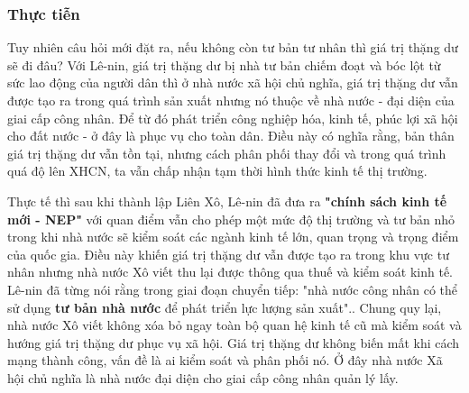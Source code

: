 \subsubsection{Thực tiễn}

Tuy nhiên câu hỏi mới đặt ra, nếu không còn tư bản tư nhân thì giá trị thặng dư sẽ đi đâu? Với Lê-nin, giá trị thặng dư bị nhà tư bản chiếm đoạt và bóc lột từ sức lao động của người dân thì ở nhà nước xã hội chủ nghĩa, giá trị thặng dư vẫn được tạo ra trong quá trình sản xuất nhưng nó thuộc về nhà nước - đại diện của giai cấp công nhân. Để từ đó phát triển công nghiệp hóa, kinh tế, phúc lợi xã hội cho đất nước - ở đây là phục vụ cho toàn dân.\cite{tax-in-kind} Điều này có nghĩa rằng, bản thân giá trị thặng dư vẫn tồn tại, nhưng cách phân phối thay đổi và trong quá trình quá độ lên XHCN, ta vẫn chấp nhận tạm thời hình thức kinh tế thị trường.

Thực tế thì sau khi thành lập Liên Xô, Lê-nin đã đưa ra \textbf{"chính sách kinh tế mới - NEP"} với quan điểm vẫn cho phép một mức độ thị trường và tư bản nhỏ trong khi nhà nước sẽ kiểm soát các ngành kinh tế lớn, quan trọng và trọng điểm của quốc gia. Điều này khiến giá trị thặng dư vẫn được tạo ra trong khu vực tư nhân nhưng nhà nước Xô viết thu lại được thông qua thuế và kiểm soát kinh tế. Lê-nin đã từng nói rằng trong giai đoạn chuyển tiếp: "nhà nước công nhân có thể sử dụng \textbf{tư bản nhà nước} để phát triển lực lượng sản xuất".\cite{State-and-revol}. Chung quy lại, nhà nước Xô viết không xóa bỏ ngay toàn bộ quan hệ kinh tế cũ mà kiểm soát và hướng giá trị thặng dư phục vụ xã hội. Giá trị thặng dư không biến mất khi cách mạng thành công, vấn đề là ai kiểm soát và phân phối nó. Ở đây nhà nước Xã hội chủ nghĩa là nhà nước đại diện cho giai cấp công nhân quản lý lấy.

